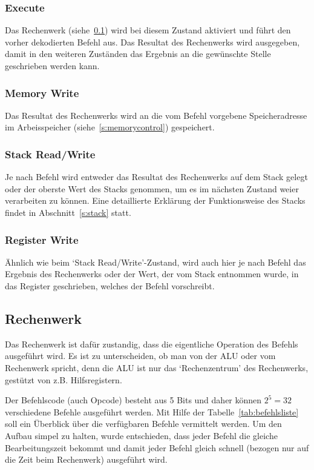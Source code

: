 \subsubsection{Execute}
Das Rechenwerk (siehe~\ref{s:alu}) wird bei diesem Zustand aktiviert und führt
den vorher dekodierten Befehl aus. Das Resultat des Rechenwerks wird ausgegeben,
damit in den weiteren Zuständen das Ergebnis an die gewünschte Stelle
geschrieben werden kann.
\subsubsection{Memory Write}
Das Resultat des Rechenwerks wird an die vom Befehl vorgebene Speicheradresse im
Arbeisspeicher (siehe~\ref{s:memorycontrol}) gespeichert.
\subsubsection{Stack Read/Write}
Je nach Befehl wird entweder das Resultat des Rechenwerks auf dem Stack gelegt
oder der oberste Wert des Stacks genommen, um es im nächsten Zustand weier
verarbeiten zu können. Eine detaillierte Erklärung der Funktionsweise des Stacks
findet in Abschnitt~\ref{s:stack} statt.
\subsubsection{Register Write}
Ähnlich wie beim `Stack Read/Write'-Zustand, wird auch hier je nach Befehl das
Ergebnis des Rechenwerks oder der Wert, der vom Stack entnommen wurde, in das
Register geschrieben, welches der Befehl vorschreibt.
\subsection{Rechenwerk}
\label{s:alu}
Das Rechenwerk ist dafür zustandig, dass die eigentliche Operation des Befehls
ausgeführt wird. Es ist zu unterscheiden, ob man von der \ac{ALU} oder vom
Rechenwerk spricht, denn die \ac{ALU} ist nur das `Rechenzentrum' des
Rechenwerks, gestützt von z.B. Hilfsregistern.

Der Befehlscode (auch Opcode) besteht aus 5 Bits und daher können $2^{5} = 32$
verschiedene Befehle ausgeführt werden. Mit Hilfe der
Tabelle~\ref{tab:befehlsliste} soll ein Überblick über die verfügbaren Befehle
vermittelt werden. Um den Aufbau simpel zu halten, wurde entschieden, dass jeder
Befehl die gleiche Bearbeitungszeit bekommt und damit jeder Befehl gleich
schnell (bezogen nur auf die Zeit beim Rechenwerk) ausgeführt wird.

